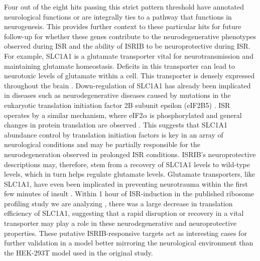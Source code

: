 \documentclass[10pt, oneside]{article}
\begin{document}
Four out of the eight hits passing this strict pattern threshold have annotated neurological functions or are integrally ties to a pathway that functions in neurogenesis. This provides further context to these particular hits for future follow-up for whether these genes contribute to the neurodegenerative phenotypes observed during ISR and the ability of ISRIB to be neuroprotective during ISR. For example, SLC1A1 is a glutamate transporter vital for neurotransmission and maintaining glutamate homeostasis. Deficits in this transporter can lead to neurotoxic levels of glutamate within a cell. This transporter is densely expressed throughout the brain \cite{slc1a1_neurotoxic}. Down-regulation of SLC1A1 has already been implicated in diseases such as neurodegenerative diseases caused by mutations in the eukaryotic translation initiation factor 2B subunit epsilon (eIF2B5) \cite{eif2b_neuroprotective}. ISR operates by a similar mechanism, where eIF2$\alpha$ is phosphorylated and general changes in protein translation are observed \cite{isrib_riboseq, isrib_structure}. This suggests that SLC1A1 abundance control by translation initiation factors is key in an array of neurological conditions and may be partially responsible for the neurodegeneration observed in prolonged ISR conditions. ISRIB's neuroprotective descriptions may, therefore, stem from a recovery of SLC1A1 levels to wild-type levels, which in turn helps regulate glutamate levels. Glutamate transporters, like SLC1A1, have even been implicated in preventing neurotrauma within the first few minutes of insult \cite{slc1a1_neurotoxic}. Within 1 hour of ISR-induction in the published ribosome profiling study we are analyzing \cite{isrib_riboseq}, there was a large decrease in translation efficiency of SLC1A1, suggesting that a rapid disruption or recovery in a vital transporter may play a role in these neurodegenerative and neuroprotective properties. These putative ISRIB-responsive targets act as interesting cases for further validation in a model better mirroring the neurological environment than the HEK-293T model used in the original study. \par
\end{document}
